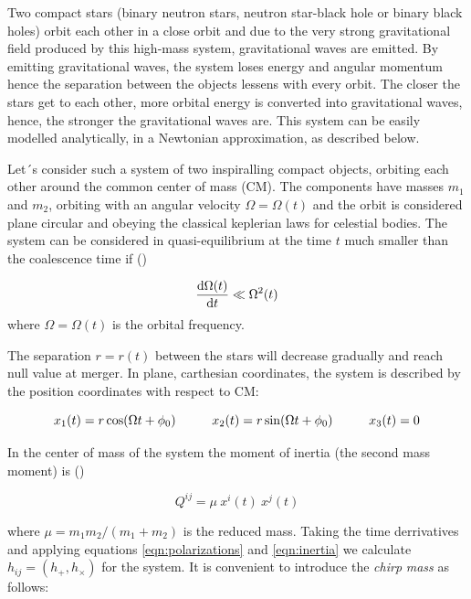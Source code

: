 \documentclass[epsf]{article}
\begin{document}
Two compact stars (binary neutron stars, neutron star-black hole or binary black holes) orbit each other in a 
close orbit and due to the very strong gravitational field produced by this high-mass system, gravitational waves are emitted. By emitting gravitational waves, the system loses energy and angular momentum hence the separation between the objects lessens with every orbit. The closer the stars get to each other, more orbital energy is converted into gravitational waves, hence, the stronger the gravitational waves are. This system can be easily modelled analytically, in a Newtonian approximation, as described below. 

Let´s consider such a system of two inspiralling compact objects, orbiting each other around the common 
center of mass (CM). The components have masses $m_1$ and $m_2$, orbiting with an angular velocity $\Omega=\Omega(t)$ and the orbit is considered plane circular and obeying the classical keplerian laws for celestial bodies. The system can be considered in quasi-equilibrium  at the time $t$ much smaller than the coalescence time if (\cite{maggiore})

\begin{equation}
\frac {{\rm d} \Omega(t)}{{\rm d}t} \ll \Omega^2(t)
\end{equation}
where $\Omega=\Omega(t)$ is the orbital frequency.

The separation $r=r(t)$ between the stars will decrease gradually and reach null value at merger. In plane, carthesian coordinates, the system is described by the position coordinates with respect to CM:

\begin{equation}
x_1(t) = r \cos (\Omega t+ \phi_0) \hspace{10mm}
x_2(t) = r \sin (\Omega t+ \phi_0) \hspace{10mm}
x_3(t)=0
\end{equation}

In the center of mass of the system the moment of inertia (the second mass moment) is (\cite{maggiore,ian})

\begin{equation}
Q^{ij} = \mu~x^i(t)~x^j(t)
\end{equation}

where $\mu=m_1m_2/(m_1+m_2)$ is the reduced mass. Taking the time derrivatives and applying equations \ref{eqn:polarizations} and \ref{eqn:inertia} we calculate $h_{ij}=(h_+, h_{\times})$ for the system. It is convenient to introduce the {\it chirp} {\it mass} as follows:
\end{document}
